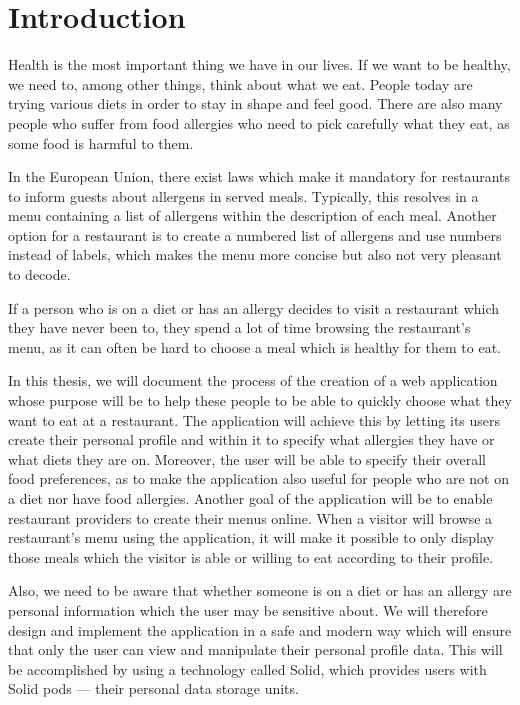 \chapter*{Introduction}

Health is the most important thing we have in our lives.
If we want to be healthy, we need to, among other things, think about what we eat.
People today are trying various diets in order to stay in shape and feel good.
There are also many people who suffer from food allergies who need to pick carefully what they eat, as some food is harmful to them. 

In the European Union, there exist laws which make it mandatory for restaurants to inform guests about allergens in served meals. Typically, this resolves in a menu containing a list of allergens within the description of each meal. Another option for a restaurant is to create a numbered list of allergens and use numbers instead of labels, which makes the menu more concise but also not very pleasant to decode.

If a person who is on a diet or has an allergy decides to visit a restaurant which they have never been to, they spend a lot of time browsing the restaurant's menu, as it can often be hard to choose a meal which is healthy for them to eat.

In this thesis, we will document the process of the creation of a web application whose purpose will be to help these people to be able to quickly choose what they want to eat at a restaurant. 
The application will achieve this by letting its users create their personal profile and within it to specify what allergies they have or what diets they are on. Moreover, the user will be able to specify their overall food preferences, as to make the application also useful for people who are not on a diet nor have food allergies.
Another goal of the application will be to enable restaurant providers to create their menus online. 
When a visitor will browse a restaurant's menu using the application, it will make it possible to only display those meals which the visitor is able or willing to eat according to their profile.

Also, we need to be aware that whether someone is on a diet or has an allergy are personal information which the user may be sensitive about.
We will therefore design and implement the application in a safe and modern way which will ensure that only the user can view and manipulate their personal profile data. This will be accomplished by using a technology called Solid, which provides users with Solid pods --- their personal data storage units.